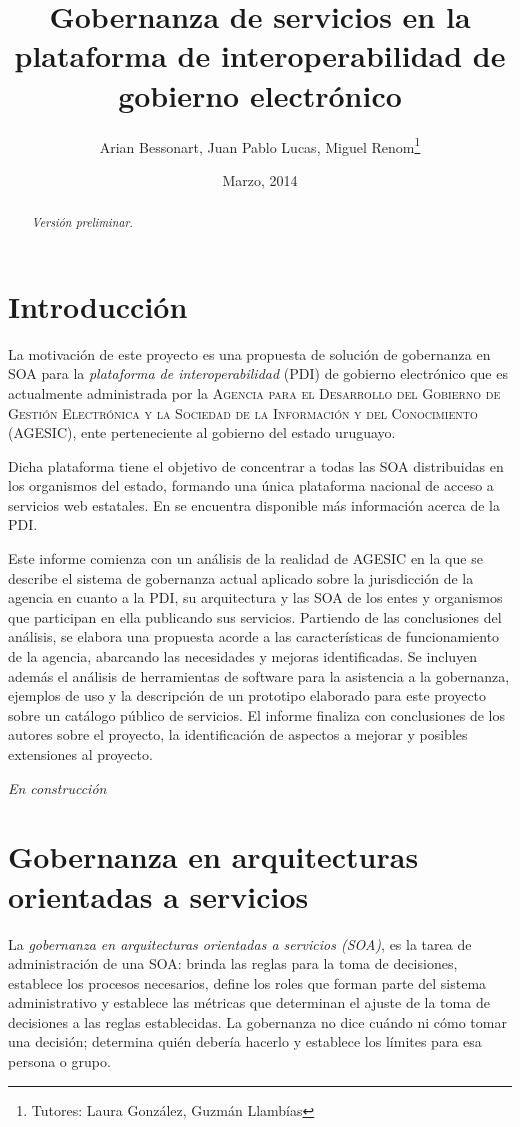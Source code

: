 \documentclass[11pt]{article}
\title{Gobernanza de servicios en la plataforma de interoperabilidad de gobierno electrónico}
\author{Arian Bessonart, Juan Pablo Lucas, Miguel Renom\thanks{Tutores: Laura González, Guzmán Llambías}}
\date{Marzo, 2014}
\begin{document}
	\maketitle
	\pagebreak

	\begin{abstract}
		\emph{Versión preliminar}.
	\end{abstract}
	\pagebreak

	\tableofcontents
	\pagebreak

	\section{Introducción}
		La motivación de este proyecto es una propuesta de solución de gobernanza en SOA para la \emph{plataforma de interoperabilidad} (PDI) de gobierno electrónico que es actualmente administrada por la \textsc{Agencia para el Desarrollo del Gobierno de Gestión Electrónica y la Sociedad de la Información y del Conocimiento (AGESIC)}, ente perteneciente al gobierno del estado uruguayo.

		Dicha plataforma tiene el objetivo de concentrar a todas las SOA distribuidas en los organismos del estado, formando una única plataforma nacional de acceso a servicios web estatales. En \cite{AGESIC:egob} se encuentra disponible más información acerca de la PDI.

		Este informe comienza con un análisis de la realidad de AGESIC en la que se describe el sistema de gobernanza actual aplicado sobre la jurisdicción de la agencia en cuanto a la PDI, su arquitectura y las SOA de los entes y organismos que participan en ella publicando sus servicios. Partiendo de las conclusiones del análisis, se elabora una propuesta acorde a las características de funcionamiento de la agencia, abarcando las necesidades y mejoras identificadas.
		Se incluyen además el análisis de herramientas de software para la asistencia a la gobernanza, ejemplos de uso y la descripción de un prototipo elaborado para este proyecto sobre un catálogo público de servicios.
		El informe finaliza con conclusiones de los autores sobre el proyecto, la identificación de aspectos a mejorar y posibles extensiones al proyecto.

		\emph{En construcción} %

	\section{Gobernanza en arquitecturas orientadas a servicios}
		\label{sec:introduccion}
		La \emph{gobernanza en arquitecturas orientadas a servicios (SOA)}, es la tarea de administración de una SOA: brinda las reglas para la toma de decisiones, establece los procesos necesarios, define los roles que forman parte del sistema administrativo y establece las métricas que determinan el ajuste de la toma de decisiones a las reglas establecidas. La gobernanza no dice cuándo ni cómo tomar una decisión; determina quién debería hacerlo y establece los límites para esa persona o grupo. \cite{Erl:2011:SGG:1983453}
\end{document}

